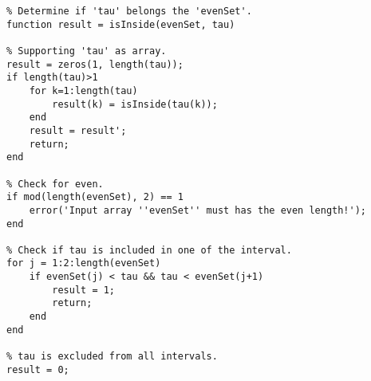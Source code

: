 \begin{verbatim}
% Determine if 'tau' belongs the 'evenSet'.
function result = isInside(evenSet, tau)

% Supporting 'tau' as array.
result = zeros(1, length(tau));
if length(tau)>1
    for k=1:length(tau)
        result(k) = isInside(tau(k));
    end
    result = result';
    return;
end

% Check for even.
if mod(length(evenSet), 2) == 1
    error('Input array ''evenSet'' must has the even length!');
end

% Check if tau is included in one of the interval.
for j = 1:2:length(evenSet)
    if evenSet(j) < tau && tau < evenSet(j+1)
        result = 1;
        return;
    end
end

% tau is excluded from all intervals.
result = 0;
\end{verbatim}
